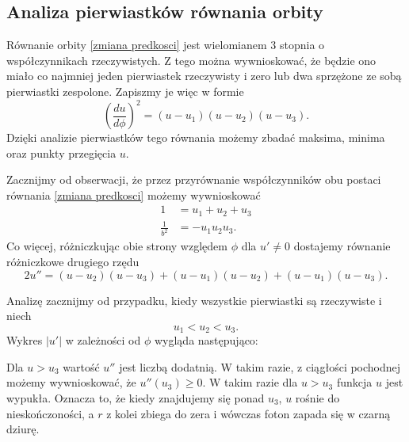 \subsection{Analiza pierwiastków równania orbity}

Równanie orbity \ref{zmiana predkosci} jest wielomianem $3$ stopnia o współczynnikach rzeczywistych. Z tego można wywnioskować, że będzie ono miało co najmniej jeden pierwiastek rzeczywisty i zero lub dwa sprzężone ze sobą pierwiastki zespolone. Zapiszmy je więc w formie
$$\left(\frac{du}{d\phi}\right)^2=(u-u_1)(u-u_2)(u-u_3).$$
Dzięki analizie pierwiastków tego równania możemy zbadać maksima, minima oraz punkty przegięcia $u$.

Zacznijmy od obserwacji, że przez przyrównanie współczynników obu postaci równania \ref{zmiana predkosci} możemy wywnioskować
\begin{align*}
  1&=u_1+u_2+u_3\\
  \frac{1}{b^2}&=-u_1u_2u_3.
\end{align*}
Co więcej, różniczkując obie strony względem $\phi$ dla $u'\neq 0$ dostajemy równanie różniczkowe drugiego rzędu
$$2u''=(u-u_2)(u-u_3)+(u-u_1)(u-u_2)+(u-u_1)(u-u_3).$$

Analizę zacznijmy od przypadku, kiedy wszystkie pierwiastki są rzeczywiste i niech 
$$u_1<u_2<u_3.$$ 
Wykres $|u'|$ w zależności od $\phi$ wygląda następująco:
\begin{center}
\end{center}

Dla $u>u_3$ wartość $u''$ jest liczbą dodatnią. W takim razie, z ciągłości pochodnej możemy wywnioskować, że $u''(u_3)\geq0$. W takim razie dla $u>u_3$ funkcja $u$ jest wypukła. Oznacza to, że kiedy znajdujemy się ponad $u_3$, $u$ rośnie do nieskończoności, a $r$ z kolei zbiega do zera i wówczas foton zapada się w czarną dziurę. 

